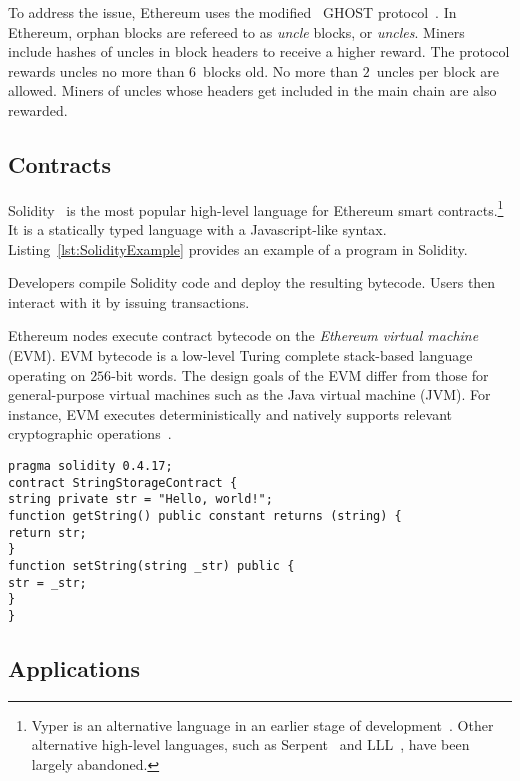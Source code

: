 To address the issue, Ethereum uses the modified~\cite{Lewenberg2015} GHOST protocol~\cite{Sompolinsky2013, EthdocsMining}.
In Ethereum, orphan blocks are refereed to as \textit{uncle} blocks, or \textit{uncles}.
Miners include hashes of uncles in block headers to receive a higher reward.
The protocol rewards uncles no more than $6$~blocks old.
No more than $2$~uncles per block are allowed.
Miners of uncles whose headers get included in the main chain are also rewarded.


\subsection{Contracts}

Solidity~\cite{Solidity17} is the most popular high-level language for Ethereum smart contracts.\footnote{Vyper is an alternative language in an earlier stage of development~\cite{Vyper}. Other alternative high-level languages, such as Serpent~\cite{SerpentGithub} and LLL~\cite{Ellison2017}, have been largely abandoned.}
It is a statically typed language with a Javascript-like syntax.
Listing~\ref{lst:SolidityExample} provides an example of a program in Solidity.

Developers compile Solidity code and deploy the resulting bytecode.
Users then interact with it by issuing transactions.

Ethereum nodes execute contract bytecode on the \textit{Ethereum virtual machine} (EVM).
EVM bytecode is a low-level Turing complete stack-based language operating on $256$-bit words.
The design goals of the EVM differ from those for general-purpose virtual machines such as the Java virtual machine (JVM).
For instance, EVM executes deterministically and natively supports relevant cryptographic operations~\cite{Buterin2017}.

\begin{lstlisting}[language=Solidity, label={lst:SolidityExample}, caption=A simple contract in Solidity]
pragma solidity 0.4.17;
contract StringStorageContract {
string private str = "Hello, world!";
function getString() public constant returns (string) {
return str;
}
function setString(string _str) public {
str = _str;
}
}
\end{lstlisting}


\subsection{Applications}

